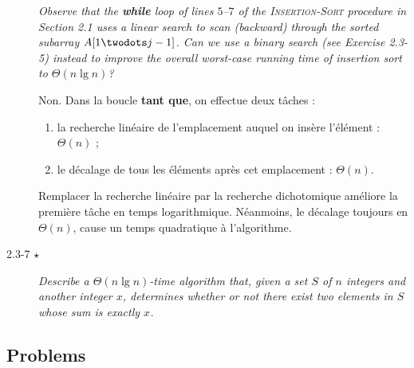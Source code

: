 \begin{description}
 {\itshape Observe that the {\bfseries while} loop of lines $5$–$7$ of the {\scshape Insertion-Sort} procedure in Section 2.1 uses a linear search to scan (backward) through the sorted subarray $A[1 \twodots j-1]$. Can we use a binary search (see Exercise 2.3-5) instead to improve the overall worst-case running time of insertion sort to $\Theta(n \lg n)$?}

  \begin{ex}
    Non. Dans la boucle \textbf{tant que}, on effectue deux t\^aches :
    \begin{enumerate}
      \item la recherche lin\'eaire de l'emplacement auquel on ins\`ere l'\'el\'ement : $\Theta (n)$ ;
      \item le d\'ecalage de tous les \'el\'ements apr\`es cet emplacement : $\Theta (n)$.
    \end{enumerate}
    Remplacer la recherche lin\'eaire par la recherche dichotomique am\'eliore la premi\`ere t\^ache en temps logarithmique. N\'eanmoins, le d\'ecalage toujours en $\Theta(n)$, cause un temps quadratique \`a l'algorithme.
  \end{ex}

\item[2.3-7 $\star$] {\itshape Describe a $\Theta (n \lg n)$-time algorithm that, given a set $S$ of $n$ integers and another integer $x$, determines whether or not there exist two elements in $S$ whose sum is exactly $x$.}

  \begin{exrev}
    
  \end{exrev}

\end{description}

\subsection{Problems}

